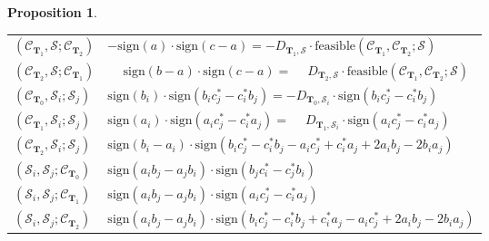 \documentclass[12pt]{article}
\newtheorem{proposition}[theorem]{Proposition}
\theoremstyle{definition}
\theoremstyle{remark}
\begin{document}
\begin{proposition}
\begin{table}[h!]
\begin{tabular}{ll}
$(\mathcal{C}_{\mathbf{T}_1}, \mathcal{S}; \mathcal{C}_{\mathbf{T}_2})$
    & $-\mathrm{sign}(a) \cdot \mathrm{sign}(c-a) = -D_{\mathbf{T}_1, \mathcal{S}} \cdot \mathrm{feasible}(\mathcal{C}_{\mathbf{T}_1}, \mathcal{C}_{\mathbf{T}_2}; \mathcal{S})$ \\
$(\mathcal{C}_{\mathbf{T}_2}, \mathcal{S}; \mathcal{C}_{\mathbf{T}_1})$
    & $\phantom{-}\mathrm{sign}(b-a) \cdot \mathrm{sign}(c-a) = \phantom{-}
    D_{\mathbf{T}_2, \mathcal{S}}\cdot \mathrm{feasible}(\mathcal{C}_{\mathbf{T}_1}, \mathcal{C}_{\mathbf{T}_2}; \mathcal{S})$ \\
\hline
$(\mathcal{C}_{\mathbf{T}_0}, \mathcal{S}_i; \mathcal{S}_j)$
    & $\mathrm{sign}(b_i) \cdot \mathrm{sign}(b_i c_j^* - c_i^* b_j) = - D_{\mathbf{T}_0,\mathcal{S}_i} \cdot \mathrm{sign}(b_i c_j^* - c_i^* b_j)$ \\
$(\mathcal{C}_{\mathbf{T}_1}, \mathcal{S}_i; \mathcal{S}_j)$
    & $\mathrm{sign}(a_i) \cdot \mathrm{sign}(a_i c_j^* - c_i^* a_j) = \phantom{-} D_{\mathbf{T}_1, \mathcal{S}_i} \cdot \mathrm{sign}(a_i c_j^* - c_i^* a_j)$ \\
$(\mathcal{C}_{\mathbf{T}_2}, \mathcal{S}_i; \mathcal{S}_j)$
    & $\mathrm{sign}(b_i-a_i) \cdot \mathrm{sign}(b_i c_j^* - c_i^* b_j - a_i c_j^* + c_i^* a_j + 2a_i b_j - 2b_i a_j)$ \\
\hline
$(\mathcal{S}_i, \mathcal{S}_j; \mathcal{C}_{\mathbf{T}_0})$
    & $\mathrm{sign}(a_i b_j - a_j b_i) \cdot \mathrm{sign}(b_j c_i^* - c_j^* b_i)$ \\
$(\mathcal{S}_i, \mathcal{S}_j; \mathcal{C}_{\mathbf{T}_1})$
    & $\mathrm{sign}(a_i b_j - a_j b_i) \cdot \mathrm{sign}(a_i c_j^* - c_i^* a_j)$ \\
$(\mathcal{S}_i, \mathcal{S}_j; \mathcal{C}_{\mathbf{T}_2})$
    & $\mathrm{sign}(a_i b_j - a_j b_i) \cdot \mathrm{sign}(b_i c_j^* - c_i^* b_j + c_i^* a_j - a_i c_j^* + 2a_i b_j - 2b_i a_j)$ \\
\hline
\end{tabular}
\end{table}
\end{proposition}
\end{document}
